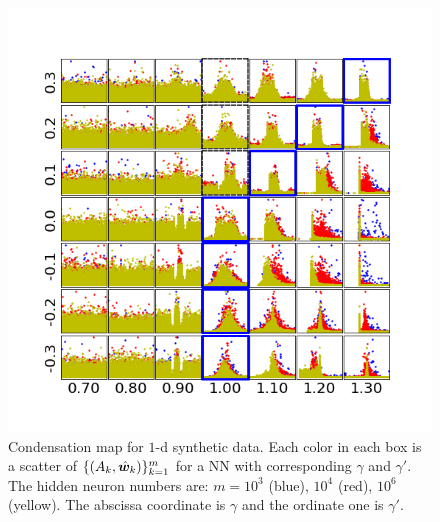 \documentclass[twoside,11pt]{article}
\begin{document}
\begin{figure}
    \centering
    \includegraphics[scale=0.8]{pic/systemexplarg3/scalestudy3/angleamptogether.png}
    \caption{Condensation map for $1$-d synthetic data. Each color in each box is a scatter of $\{(A_k,\hat{\bm{w}}_k)\}_{k=1}^m$ for a NN with corresponding $\gamma$ and $\gamma'$. The hidden neuron numbers are:  $m=10^{3}$ (blue), $10^{4}$ (red), $10^{6}$ (yellow). The abscissa coordinate is $\gamma$ and the ordinate one is $\gamma'$.}
    \label{fig:cdnmap}
\end{figure}
\end{document}

